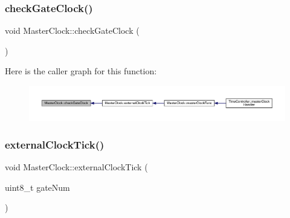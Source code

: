 \subsubsection{\texorpdfstring{check\+Gate\+Clock()}{checkGateClock()}}
{\footnotesize\ttfamily void Master\+Clock\+::check\+Gate\+Clock (\begin{DoxyParamCaption}{ }\end{DoxyParamCaption})}

Here is the caller graph for this function\+:
\nopagebreak
\begin{figure}[H]
\begin{center}
\leavevmode
\includegraphics[width=350pt]{class_master_clock_a94e8a4d26a0bb028a132d7582d602f01_icgraph}
\end{center}
\end{figure}
\mbox{\label{class_master_clock_ab64882eca80c7e2de0b9e57020661df9}} 
\subsubsection{\texorpdfstring{external\+Clock\+Tick()}{externalClockTick()}}
{\footnotesize\ttfamily void Master\+Clock\+::external\+Clock\+Tick (\begin{DoxyParamCaption}\item[{uint8\+\_\+t}]{gate\+Num }\end{DoxyParamCaption})}


